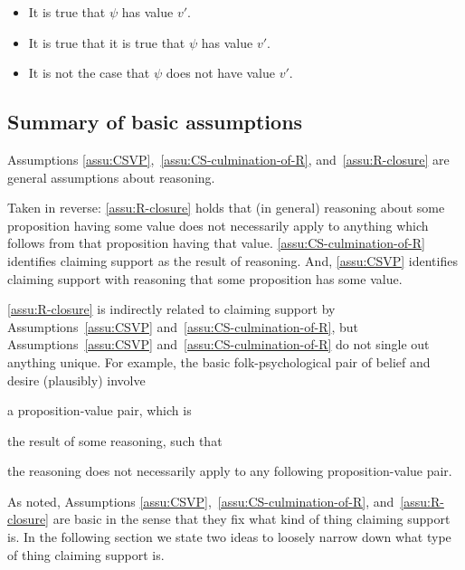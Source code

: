 \begin{note}
  \begin{itemize}
    \item It is true that \(\psi\) has value \(v'\).
    \item It is true that it is true that \(\psi\) has value \(v'\).
    \item It is not the case that \(\psi\) does not have value \(v'\).
    \end{itemize}
\end{note}


\subsection{Summary of basic assumptions}
\label{sec:summary}

\begin{note}
  Assumptions \ref{assu:CSVP},~\ref{assu:CS-culmination-of-R}, and~\ref{assu:R-closure} are general assumptions about reasoning.

  Taken in reverse:
  \autoref{assu:R-closure} holds that (in general) reasoning about some proposition having some value does not necessarily apply to anything which follows from that proposition having that value.
  \autoref{assu:CS-culmination-of-R} identifies claiming support as the result of reasoning.
  And, \autoref{assu:CSVP} identifies claiming support with reasoning that some proposition has some value.

  \autoref{assu:R-closure} is indirectly related to claiming support by Assumptions~\ref{assu:CSVP} and~\ref{assu:CS-culmination-of-R}, but Assumptions~\ref{assu:CSVP} and~\ref{assu:CS-culmination-of-R} do not single out anything unique.
  For example, the basic folk-psychological pair of belief and desire (plausibly) involve
  \begin{enumerate*}
  \item a proposition-value pair, which is
  \item the result of some reasoning, such that
  \item the reasoning does not necessarily apply to any following proposition-value pair.
  \end{enumerate*}
  As noted, Assumptions \ref{assu:CSVP},~\ref{assu:CS-culmination-of-R}, and~\ref{assu:R-closure} are basic in the sense that they fix what kind of thing claiming support is.
  In the following section we state two ideas to loosely narrow down what type of thing claiming support is.
\end{note}

